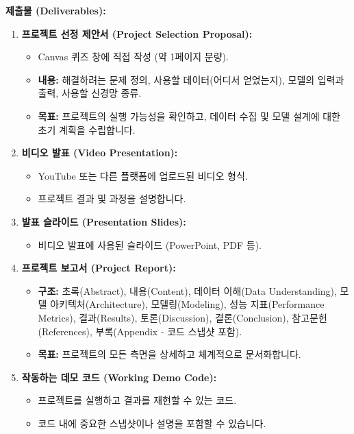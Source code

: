 \documentclass[11pt,a4paper]{article}
\theoremstyle{definition}
\begin{document}
\textbf{제출물 (Deliverables):}
\begin{enumerate}
    \item \textbf{프로젝트 선정 제안서 (Project Selection Proposal):}
        \begin{itemize}
            \item Canvas 퀴즈 창에 직접 작성 (약 1페이지 분량).
            \item \textbf{내용:} 해결하려는 문제 정의, 사용할 데이터(어디서 얻었는지), 모델의 입력과 출력, 사용할 신경망 종류.
            \item \textbf{목표:} 프로젝트의 실행 가능성을 확인하고, 데이터 수집 및 모델 설계에 대한 초기 계획을 수립합니다.
        \end{itemize}
    \item \textbf{비디오 발표 (Video Presentation):}
        \begin{itemize}
            \item YouTube 또는 다른 플랫폼에 업로드된 비디오 형식.
            \item 프로젝트 결과 및 과정을 설명합니다.
        \end{itemize}
    \item \textbf{발표 슬라이드 (Presentation Slides):}
        \begin{itemize}
            \item 비디오 발표에 사용된 슬라이드 (PowerPoint, PDF 등).
        \end{itemize}
    \item \textbf{프로젝트 보고서 (Project Report):}
        \begin{itemize}
            \item \textbf{구조:} 초록(Abstract), 내용(Content), 데이터 이해(Data Understanding), 모델 아키텍처(Architecture), 모델링(Modeling), 성능 지표(Performance Metrics), 결과(Results), 토론(Discussion), 결론(Conclusion), 참고문헌(References), 부록(Appendix - 코드 스냅샷 포함).
            \item \textbf{목표:} 프로젝트의 모든 측면을 상세하고 체계적으로 문서화합니다.
        \end{itemize}
    \item \textbf{작동하는 데모 코드 (Working Demo Code):}
        \begin{itemize}
            \item 프로젝트를 실행하고 결과를 재현할 수 있는 코드.
            \item 코드 내에 중요한 스냅샷이나 설명을 포함할 수 있습니다.
        \end{itemize}
\end{enumerate}
\end{document}
